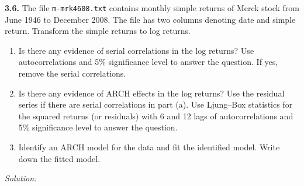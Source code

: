 \documentclass[11pt,a4paper]{article}
\newif\ifsolucoes
\newcommand{\espacoresol}{4.5cm}   %
\newcommand{\resolespaco}{\ifsolucoes\else\par\textit{Solution:}\vspace{\espacoresol}\par\fi}
\begin{document}
\noindent\textbf{3.6.} The file \texttt{m-mrk4608.txt} contains monthly simple returns of Merck stock from
June 1946 to December 2008. The file has two columns denoting date and simple return. Transform the simple
returns to log returns.
\begin{enumerate}[label=(\alph*)]
\item Is there any evidence of serial correlations in the log returns? Use autocorrelations and 5\%
significance level to answer the question. If yes, remove the serial correlations.
\item Is there any evidence of ARCH effects in the log returns? Use the residual series if there are serial
correlations in part (a). Use Ljung--Box statistics for the squared returns (or residuals) with 6 and 12 lags
of autocorrelations and 5\% significance level to answer the question.
\item Identify an ARCH model for the data and fit the identified model. Write down the fitted model.
\end{enumerate}
\resolespaco
\end{document}

